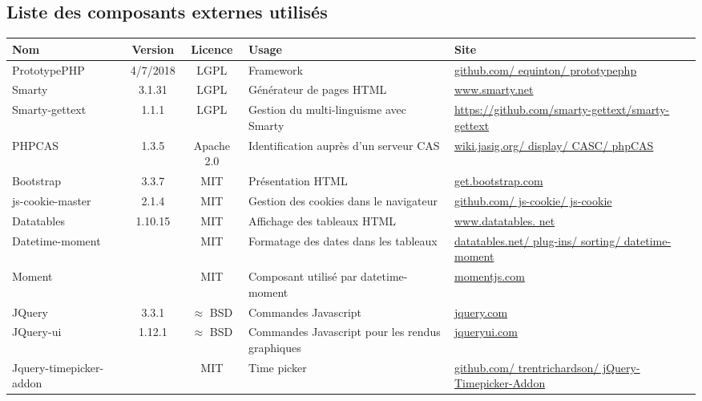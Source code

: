 \subsection{Liste des composants externes utilisés}
\begin{longtable}{|>{\raggedright\arraybackslash}p{3cm}|c|c|>{\raggedright\arraybackslash}p{3cm}|>{\raggedright\arraybackslash}p{3cm}|}
\hline 
\textbf{Nom} & \textbf{Version} & \textbf{Licence} & \textbf{Usage} & \textbf{Site} \\ 
\hline 
\endhead
PrototypePHP & 4/7/2018 & LGPL & Framework & \href{https://github.com/equinton/prototypephp}{github.com/ equinton/ prototypephp} \\ 
\hline 
Smarty & 3.1.31 & LGPL & Générateur de pages HTML & \href{http://www.smarty.net}{www.smarty.net} \\ 
\hline 
Smarty-gettext & 1.1.1 & LGPL & Gestion du multi-linguisme avec Smarty & \href{https://github.com/smarty-gettext/smarty-gettext}{https://github.com/smarty-gettext/smarty-gettext} \\
\hline
PHPCAS & 1.3.5 & Apache 2.0 & Identification auprès d'un serveur CAS & \href{https://wiki.jasig.org/display/CASC/phpCAS}{wiki.jasig.org/ display/ CASC/ phpCAS} \\ 
\hline 
Bootstrap & 3.3.7 & MIT & Présentation HTML & \href{http://getbootstrap.com}{get.bootstrap.com} \\ 
\hline 
js-cookie-master & 2.1.4 & MIT & Gestion des cookies dans le navigateur & \href{https://github.com/js-cookie/js-cookie}{github.com/ js-cookie/ js-cookie} \\ 
\hline 
Datatables & 1.10.15 & MIT & Affichage des tableaux HTML & \href{http://www.datatables.net/}{www.datatables. net} \\ 
\hline 
Datetime-moment &  & MIT & Formatage des dates dans les tableaux & \href{https://datatables.net/plug-ins/sorting/datetime-moment}{datatables.net/ plug-ins/ sorting/ datetime-moment} \\ 
\hline 
Moment &  & MIT & Composant utilisé par datetime-moment & \href{http://momentjs.com} {momentjs.com}\\ 
\hline 
JQuery & 3.3.1 & $\approx$ BSD & Commandes Javascript & \href{http://jquery.com/}{jquery.com} \\ 
\hline 
JQuery-ui & 1.12.1 & $\approx$ BSD & Commandes Javascript pour les rendus graphiques & \href{http://jqueryui.com/}{jqueryui.com} \\ 
\hline 
Jquery-timepicker-addon &  & MIT & Time picker & \href{https://github.com/trentrichardson/jQuery-Timepicker-Addon}{github.com/ trentrichardson/ jQuery-Timepicker-Addon} \\ 

\end{longtable}
